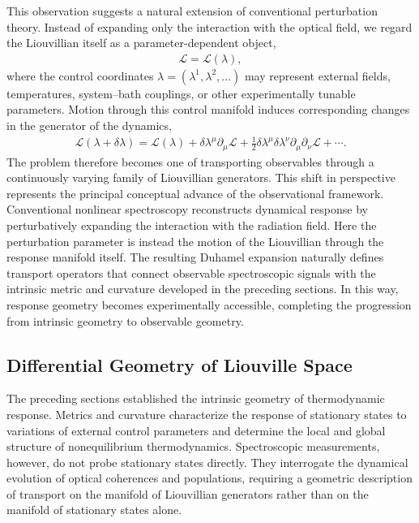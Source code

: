 This observation suggests a natural extension of conventional
perturbation theory. Instead of expanding only the interaction
with the optical field, we regard the Liouvillian itself as a
parameter-dependent object,
\begin{align}
\mathcal L
=
\mathcal L(\lambda),
\end{align}
where the control coordinates
$\lambda=(\lambda^1,\lambda^2,\ldots)$
may represent external fields, temperatures, system--bath
couplings, or other experimentally tunable parameters. Motion
through this control manifold induces corresponding changes in
the generator of the dynamics,
\begin{align}
\mathcal L(\lambda+\delta\lambda)
=
\mathcal L(\lambda)
+
\delta\lambda^\mu
\partial_\mu\mathcal L
+
\frac12
\delta\lambda^\mu
\delta\lambda^\nu
\partial_\mu\partial_\nu\mathcal L
+\cdots.
\end{align}
The problem therefore becomes one of transporting observables
through a continuously varying family of Liouvillian generators.
This shift in perspective represents the principal conceptual
advance of the observational framework. Conventional nonlinear
spectroscopy reconstructs dynamical response by perturbatively
expanding the interaction with the radiation field. Here the
perturbation parameter is instead the motion of the Liouvillian
through the response manifold itself. The resulting Duhamel
expansion naturally defines transport operators that connect
observable spectroscopic signals with the intrinsic metric and
curvature developed in the preceding sections. In this way,
response geometry becomes experimentally accessible, completing
the progression from intrinsic geometry to observable geometry.




\subsection{Differential Geometry of Liouville Space}
\label{subsec:liouville_geometry}
The preceding sections established the intrinsic geometry of
thermodynamic response. Metrics and curvature characterize the
response of stationary states to variations of external control
parameters and determine the local and global structure of
nonequilibrium thermodynamics. Spectroscopic measurements,
however, do not probe stationary states directly. They interrogate
the dynamical evolution of optical coherences and populations,
requiring a geometric description of transport on the manifold of
Liouvillian generators rather than on the manifold of stationary
states alone.

